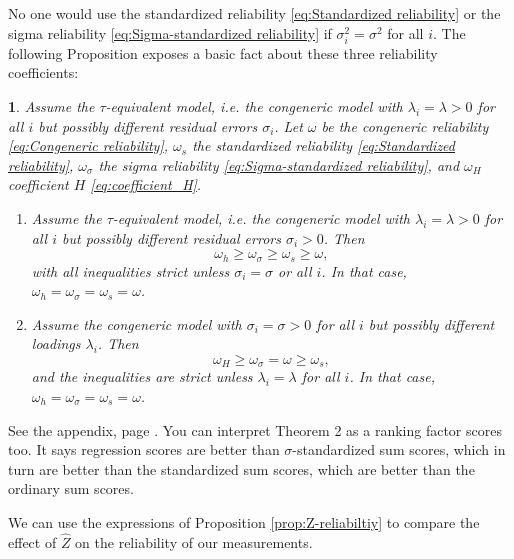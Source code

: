\documentclass{article}
\makeatletter
\theoremstyle{plain}
\theoremstyle{plain}
\theoremstyle{definition}
\theoremstyle{remark}
\theoremstyle{definition}
\theoremstyle{plain}
\theoremstyle{plain}
\newtheorem{prop}[thm]{\protect\propositionname}
\theoremstyle{definition}
\newenvironment{proof}[1][\protect\proofname]{\par
	\normalfont\topsep6\p@\@plus6\p@\relax
	\trivlist
	\itemindent\parindent
	\item[\hskip\labelsep\scshape #1]\ignorespaces
}{%
	\endtrivlist\@endpefalse
}
\providecommand{\proofname}{Proof}
\providecommand{\propositionname}{Proposition}
\makeatother
\begin{document}
No one would use the standardized reliability \eqref{eq:Standardized reliability}
or the sigma reliability \eqref{eq:Sigma-standardized reliability}
if $\sigma_{i}^{2}=\sigma^{2}$ for all $i$. The following Proposition
exposes a basic fact about these three reliability coefficients:
\begin{prop}
\label{prop:Properties of three} Assume the $\tau$-equivalent model,
i.e. the congeneric model with $\lambda_{i}=\lambda>0$ for all $i$
but possibly different residual errors $\sigma_{i}$. Let $\omega$ be the congeneric
reliability \eqref{eq:Congeneric reliability}, $\omega_{s}$ the standardized reliability \eqref{eq:Standardized reliability},
$\omega_{\sigma}$ the sigma reliability \eqref{eq:Sigma-standardized reliability},
and $\omega_{H}$ coefficient $H$ \eqref{eq:coefficient_H}. 

\begin{enumerate}[label=(\roman*)]
\item Assume the $\tau$-equivalent model,
i.e. the congeneric model with $\lambda_{i}=\lambda>0$ for all $i$
but possibly different residual errors $\sigma_{i}>0$. Then
\[
\omega_{h}\geq\omega_{\sigma}\geq\omega_{s}\geq\omega,
\]
with all inequalities strict unless $\sigma_{i}=\sigma$ or all
$i$. In that case, $\omega_{h} = \omega_{\sigma} = \omega_{s} = \omega$.
\item Assume the congeneric model with $\sigma_i = \sigma > 0$ for all $i$ but possibly different loadings $\lambda_i$. Then
\[
\omega_{H}\geq\omega_{\sigma}=\omega\geq\omega_{s},
\]
and the inequalities are strict unless $\lambda_{i}=\lambda$ for all
$i$. In that case, $\omega_{h} = \omega_{\sigma} = \omega_{s} = \omega$.

\end{enumerate}

\end{prop}
\begin{proof}
See the appendix, page \pageref{proof:Properties}.
\end{proof}
You can interpret Theorem 2 as a ranking factor scores too. It says
regression scores are better than $\sigma$-standardized sum scores,
which in turn are better than the standardized sum scores, which are
better than the ordinary sum scores.

We can use the expressions of Proposition \ref{prop:Z-reliabiltiy}
to compare the effect of $\widehat{Z}$ on the reliability of our
measurements.
\end{document}
